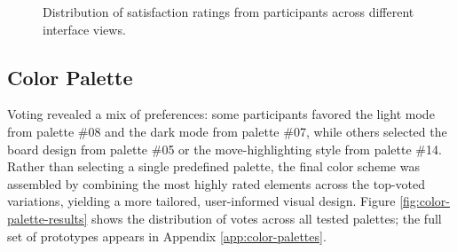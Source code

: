 \begin{figure}[h!]
\centering
{}
\caption{Distribution of satisfaction ratings from participants across different interface views.}
\label{fig:wireframe-test-results}
\end{figure}



\subsection{Color Palette}
\label{subsec:results-color-palette}
Voting revealed a mix of preferences: some participants favored the light mode from palette \#08 and the dark mode from palette \#07, while others selected the board design from palette \#05 or the move-highlighting style from palette \#14. \\

Rather than selecting a single predefined palette, the final color scheme was assembled by combining the most highly rated elements across the top-voted variations, yielding a more tailored, user-informed visual design. Figure \ref{fig:color-palette-results} shows the distribution of votes across all tested palettes; the full set of prototypes appears in Appendix \ref{app:color-palettes}.

